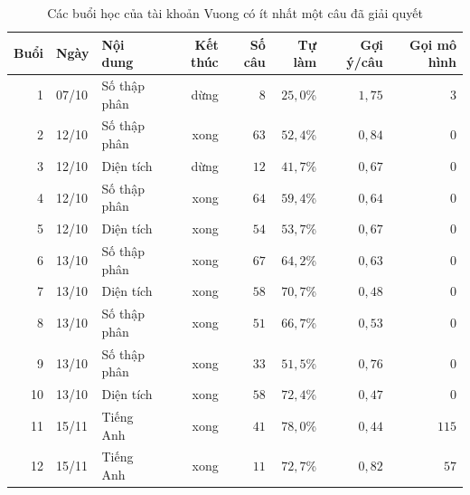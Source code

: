 \begin{table}[H]
\centering
\caption{Các buổi học của tài khoản Vuong có ít nhất một câu đã giải quyết}\label{tab:db-sessions}
\small
\begin{tabular}{rllrrrrr}
\toprule
Buổi & Ngày & Nội dung & Kết thúc & Số câu & Tự làm & Gợi ý/câu & Gọi mô hình \\
\midrule
1 & 07/10 & Số thập phân & dừng & $8$ & $25{,}0$\% & $1{,}75$ & $3$ \\
2 & 12/10 & Số thập phân & xong & $63$ & $52{,}4$\% & $0{,}84$ & $0$ \\
3 & 12/10 & Diện tích & dừng & $12$ & $41{,}7$\% & $0{,}67$ & $0$ \\
4 & 12/10 & Số thập phân & xong & $64$ & $59{,}4$\% & $0{,}64$ & $0$ \\
5 & 12/10 & Diện tích & xong & $54$ & $53{,}7$\% & $0{,}67$ & $0$ \\
6 & 13/10 & Số thập phân & xong & $67$ & $64{,}2$\% & $0{,}63$ & $0$ \\
7 & 13/10 & Diện tích & xong & $58$ & $70{,}7$\% & $0{,}48$ & $0$ \\
8 & 13/10 & Số thập phân & xong & $51$ & $66{,}7$\% & $0{,}53$ & $0$ \\
9 & 13/10 & Số thập phân & xong & $33$ & $51{,}5$\% & $0{,}76$ & $0$ \\
10 & 13/10 & Diện tích & xong & $58$ & $72{,}4$\% & $0{,}47$ & $0$ \\
11 & 15/11 & Tiếng Anh & xong & $41$ & $78{,}0$\% & $0{,}44$ & $115$ \\
12 & 15/11 & Tiếng Anh & xong & $11$ & $72{,}7$\% & $0{,}82$ & $57$ \\
\bottomrule
\end{tabular}
\end{table}
